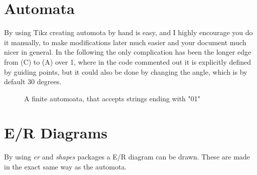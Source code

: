 \documentclass[a4, english, twoside]{article}
\begin{document}
\section{Automata}
By using Tikz creating automota by hand is easy, and I highly encourage you do it manually, to make modifications later much easier and your document much nicer in general. In the following the only complication has been the longer edge from (C) to (A) over 1, where in the code commented out it is explicitly defined by guiding points, but it could also be done by changing the angle, which is by default 30 degrees.
\begin{figure}[htbp]
    \centering
    \caption{A finite automoata, that accepts strings ending with "01"}
    \label{fig:FA}
\end{figure}

\section{E/R Diagrams} \label{sec:ER}
By using \emph{er} and \emph{shapes} packages a E/R diagram can be drawn. These are made in the exact same way as the automota.
\end{document}
